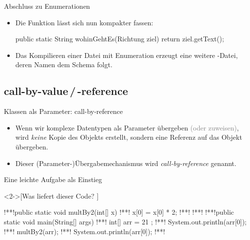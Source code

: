 \begin{frame}[fragile]{Abschluss zu Enumerationen}
    \begin{itemize}[<+(1)->]
        \widei
        \item Die Funktion  lässt sich nun kompakter fassen:\pause{}
\begin{plainjava}
public static String wohinGehtEs(Richtung ziel){
    return ziel.getText();
}
\end{plainjava}
        \item Das Kompilieren einer Datei mit Enumeration erzeugt eine weitere -Datei,\pause{} deren Namen dem Schema  folgt.
    \end{itemize}
\end{frame}


\subsection{call-by-value\,/\,-reference}
\begin{frame}[fragile]{Klassen als Parameter: call-by-reference}
    \begin{itemize}[<+(1)->]
        \widei
        \item \hypertarget<1>{mrk:call-by-ref}{}Wenn wir komplexe Datentypen als Parameter übergeben \textcolor{gray}{(oder zuweisen)},\pause{} wird \emph{keine} Kopie des Objekts erstellt,\pause{} sondern eine Referenz auf das Objekt übergeben.
        \item Dieser (Parameter-)Übergabemechanismus wird \emph{call-by-reference} genannt.
    \end{itemize}
\end{frame}

\ifull
\begin{frame}[fragile,c]{Eine leichte Aufgabe als Einstieg}
    \begin{exercise}<2->[Was liefert dieser Code? ]
        \begin{plainjava}
!**!public static void multBy2(int[] x){
!**!    x[0] = x[0] * 2;
!**!}
!**!
!**!public static void main(String[] args) {
!**!    int[] arr = { 21 };
!**!    System.out.println(arr[0]);
!**!    multBy2(arr);
!**!    System.out.println(arr[0]);
!**!}
        \end{plainjava}
    \end{exercise}
\end{frame}


